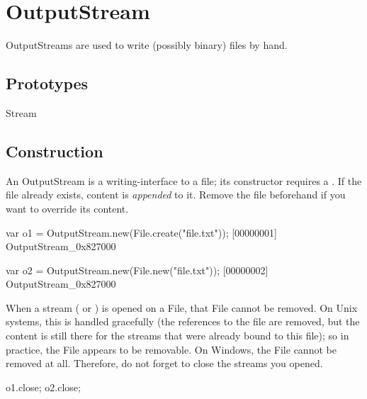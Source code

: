 
\section{OutputStream}

OutputStreams are used to write (possibly binary) files by hand.

\subsection{Prototypes}
\begin{refObjects}
\item[Stream]
\end{refObjects}

\subsection{Construction}
\label{sec:specs:OutputStream:ctor}

An OutputStream is a writing-interface to a file; its constructor
requires a .  If the file already exists, content is
\emph{appended} to it.  Remove the file beforehand if you want to
override its content.

\begin{urbiscript}
var o1 = OutputStream.new(File.create("file.txt"));
[00000001] OutputStream_0x827000

var o2 = OutputStream.new(File.new("file.txt"));
[00000002] OutputStream_0x827000
\end{urbiscript}

When a stream ( or ) is
opened on a File, that File cannot be removed.  On Unix systems, this is
handled gracefully (the references to the file are removed, but the content
is still there for the streams that were already bound to this file); so in
practice, the File appears to be removable.  On Windows, the File cannot be
removed at all.  Therefore, do not forget to close the streams you opened.

\begin{urbiscript}
o1.close;
o2.close;
\end{urbiscript}

